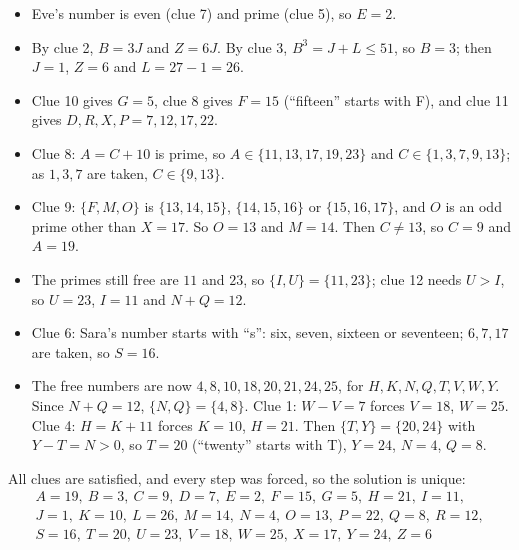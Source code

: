 \begin{itemize}
\item Eve's number is even (clue 7) and prime (clue 5), so $E=2$.
\item By clue 2, $B=3J$ and $Z=6J$. By clue 3, $B^3=J+L\le51$, so $B=3$; then $J=1$, $Z=6$ and $L=27-1=26$.
\item Clue 10 gives $G=5$, clue 8 gives $F=15$ (``fifteen'' starts with F), and clue 11 gives $D,R,X,P=7,12,17,22$.
\item Clue 8: $A=C+10$ is prime, so $A\in\{11,13,17,19,23\}$ and $C\in\{1,3,7,9,13\}$; as $1,3,7$ are taken, $C\in\{9,13\}$.
\item Clue 9: $\{F,M,O\}$ is $\{13,14,15\}$, $\{14,15,16\}$ or $\{15,16,17\}$, and $O$ is an odd prime other than $X=17$. So $O=13$ and $M=14$. Then $C\ne13$, so $C=9$ and $A=19$.
\item The primes still free are $11$ and $23$, so $\{I,U\}=\{11,23\}$; clue 12 needs $U>I$, so $U=23$, $I=11$ and $N+Q=12$.
\item Clue 6: Sara's number starts with ``s'': six, seven, sixteen or seventeen; $6,7,17$ are taken, so $S=16$.
\item The free numbers are now $4,8,10,18,20,21,24,25$, for $H,K,N,Q,T,V,W,Y$. Since $N+Q=12$, $\{N,Q\}=\{4,8\}$. Clue 1: $W-V=7$ forces $V=18$, $W=25$. Clue 4: $H=K+11$ forces $K=10$, $H=21$. Then $\{T,Y\}=\{20,24\}$ with $Y-T=N>0$, so $T=20$ (``twenty'' starts with T), $Y=24$, $N=4$, $Q=8$.
\end{itemize}
All clues are satisfied, and every step was forced, so the solution is unique:
\[\boxed{\begin{array}{l}A=19,\ B=3,\ C=9,\ D=7,\ E=2,\ F=15,\ G=5,\ H=21,\ I=11,\\ J=1,\ K=10,\ L=26,\ M=14,\ N=4,\ O=13,\ P=22,\ Q=8,\ R=12,\\ S=16,\ T=20,\ U=23,\ V=18,\ W=25,\ X=17,\ Y=24,\ Z=6\end{array}}\]
